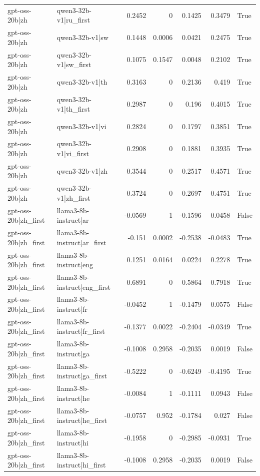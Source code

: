 \begin{table}
\begin{tabular}{l l r r r r l}
gpt-oss-20b|zh & qwen3-32b-v1|ru_first & 0.2452 & 0 & 0.1425 & 0.3479 & True \\
gpt-oss-20b|zh & qwen3-32b-v1|sw & 0.1448 & 0.0006 & 0.0421 & 0.2475 & True \\
gpt-oss-20b|zh & qwen3-32b-v1|sw_first & 0.1075 & 0.1547 & 0.0048 & 0.2102 & True \\
gpt-oss-20b|zh & qwen3-32b-v1|th & 0.3163 & 0 & 0.2136 & 0.419 & True \\
gpt-oss-20b|zh & qwen3-32b-v1|th_first & 0.2987 & 0 & 0.196 & 0.4015 & True \\
gpt-oss-20b|zh & qwen3-32b-v1|vi & 0.2824 & 0 & 0.1797 & 0.3851 & True \\
gpt-oss-20b|zh & qwen3-32b-v1|vi_first & 0.2908 & 0 & 0.1881 & 0.3935 & True \\
gpt-oss-20b|zh & qwen3-32b-v1|zh & 0.3544 & 0 & 0.2517 & 0.4571 & True \\
gpt-oss-20b|zh & qwen3-32b-v1|zh_first & 0.3724 & 0 & 0.2697 & 0.4751 & True \\
gpt-oss-20b|zh_first & llama3-8b-instruct|ar & -0.0569 & 1 & -0.1596 & 0.0458 & False \\
gpt-oss-20b|zh_first & llama3-8b-instruct|ar_first & -0.151 & 0.0002 & -0.2538 & -0.0483 & True \\
gpt-oss-20b|zh_first & llama3-8b-instruct|eng & 0.1251 & 0.0164 & 0.0224 & 0.2278 & True \\
gpt-oss-20b|zh_first & llama3-8b-instruct|eng_first & 0.6891 & 0 & 0.5864 & 0.7918 & True \\
gpt-oss-20b|zh_first & llama3-8b-instruct|fr & -0.0452 & 1 & -0.1479 & 0.0575 & False \\
gpt-oss-20b|zh_first & llama3-8b-instruct|fr_first & -0.1377 & 0.0022 & -0.2404 & -0.0349 & True \\
gpt-oss-20b|zh_first & llama3-8b-instruct|ga & -0.1008 & 0.2958 & -0.2035 & 0.0019 & False \\
gpt-oss-20b|zh_first & llama3-8b-instruct|ga_first & -0.5222 & 0 & -0.6249 & -0.4195 & True \\
gpt-oss-20b|zh_first & llama3-8b-instruct|he & -0.0084 & 1 & -0.1111 & 0.0943 & False \\
gpt-oss-20b|zh_first & llama3-8b-instruct|he_first & -0.0757 & 0.952 & -0.1784 & 0.027 & False \\
gpt-oss-20b|zh_first & llama3-8b-instruct|hi & -0.1958 & 0 & -0.2985 & -0.0931 & True \\
gpt-oss-20b|zh_first & llama3-8b-instruct|hi_first & -0.1008 & 0.2958 & -0.2035 & 0.0019 & False \\

\end{tabular}
\end{table}
